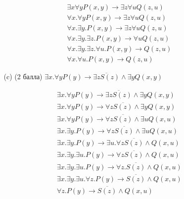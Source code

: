 \begin{enumerate}
\begin{itemize}
\begin{solution}
\begin{align*}
                &\exists x\forall y P(x, y) \rightarrow \exists z\forall u Q(z, u) \\
                &\forall x . \forall y P(x, y) \rightarrow \exists z\forall u Q(z, u) \\
                &\forall x . \exists y . P(x, y) \rightarrow \exists z\forall u Q(z, u) \\
                &\forall x . \exists y . \exists z . P(x, y) \rightarrow \forall u Q(z, u) \\
                &\forall x . \exists y . \exists z . \forall u . P(x, y) \rightarrow Q(z, u) \\
                &\forall x . \forall u . P(x, y) \rightarrow Q(z, u)
            \end{align*}
        \end{solution}
        \item[(c)] (2 балла) $\exists x. \forall y P(y) \rightarrow \overline{\exists z S(z)} \land \exists y Q(x, y)$
        \begin{solution}
            \begin{align*}
                &\exists x. \forall y P(y) \rightarrow \overline{\exists z S(z)} \land \exists y Q(x, y) \\
                &\exists x. \forall y P(y) \rightarrow \forall z \overline{S(z)} \land \exists y Q(x, y) \\
                &\exists x. \forall y P(y) \rightarrow \forall z \overline{S(z)} \land \exists u Q(x, u) \\
                &\exists x. \exists y . P(y) \rightarrow \forall z \overline{S(z)} \land \exists u Q(x, u) \\
                &\exists x. \exists y . P(y) \rightarrow \exists u . \forall z \overline{S(z)} \land  Q(x, u) \\
                &\exists x. \exists y . \exists u . P(y) \rightarrow \forall z \overline{S(z)} \land  Q(x, u) \\
                &\exists x. \exists y . \exists u . P(y) \rightarrow \forall z . \overline{S(z)} \land  Q(x, u) \\
                &\exists x. \exists y . \exists u . \forall z . P(y) \rightarrow \overline{S(z)} \land  Q(x, u) \\
                &\forall z . P(y) \rightarrow \overline{S(z)} \land  Q(x, u)
            \end{align*}
        \end{solution}
    \end{itemize}
\end{enumerate}
\clearpage
